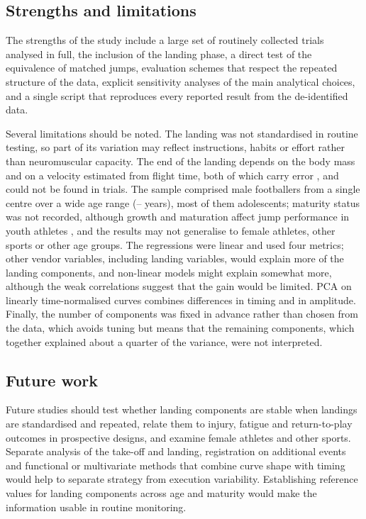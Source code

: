 \subsection{Strengths and limitations}

The strengths of the study include a large set of routinely collected trials analysed in full, the inclusion of the landing phase, a direct test of the equivalence of matched jumps, evaluation schemes that respect the repeated structure of the data, explicit sensitivity analyses of the main analytical choices, and a single script that reproduces every reported result from the de-identified data.

Several limitations should be noted. The landing was not standardised in routine testing, so part of its variation may reflect instructions, habits or effort rather than neuromuscular capacity. The end of the landing depends on the body mass and on a velocity estimated from flight time, both of which carry error \citep{street2001}, and could not be found in \nLowcomMissing{} trials. The sample comprised male footballers from a single centre over a wide age range (\ageMin--\ageMax{} years), most of them adolescents; maturity status was not recorded, although growth and maturation affect jump performance in youth athletes \citep{malina2015,lloyd2012}, and the results may not generalise to female athletes, other sports or other age groups. The regressions were linear and used four metrics; other vendor variables, including landing variables, would explain more of the landing components, and non-linear models might explain somewhat more, although the weak correlations suggest that the gain would be limited. PCA on linearly time-normalised curves combines differences in timing and in amplitude. Finally, the number of components was fixed in advance rather than chosen from the data, which avoids tuning but means that the remaining components, which together explained about a quarter of the variance, were not interpreted.

\subsection{Future work}

Future studies should test whether landing components are stable when landings are standardised and repeated, relate them to injury, fatigue and return-to-play outcomes in prospective designs, and examine female athletes and other sports. Separate analysis of the take-off and landing, registration on additional events and functional or multivariate methods that combine curve shape with timing would help to separate strategy from execution variability. Establishing reference values for landing components across age and maturity would make the information usable in routine monitoring.

